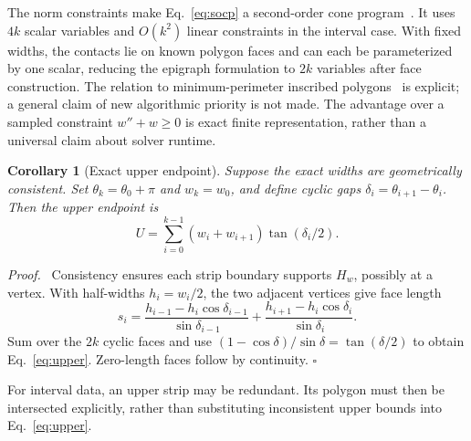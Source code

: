 \documentclass[11pt,a4paper]{article}
\newtheorem{corollary}[theorem]{Corollary}
\newenvironment{proof}{\par\noindent\textit{Proof.}\ }{\hfill$\square$\par\medskip}
\begin{document}
The norm constraints make Eq.~\eqref{eq:socp} a second-order cone program~\cite{lobo}. It uses $4k$ scalar variables and $O(k^2)$ linear constraints in the interval case. With fixed widths, the contacts lie on known polygon faces and can each be parameterized by one scalar, reducing the epigraph formulation to $2k$ variables after face construction. The relation to minimum-perimeter inscribed polygons~\cite{kodmon} is explicit; a general claim of new algorithmic priority is not made. The advantage over a sampled constraint $w''+w\ge0$ is exact finite representation, rather than a universal claim about solver runtime.

\begin{corollary}[Exact upper endpoint]
\label{cor:upper}
Suppose the exact widths are geometrically consistent. Set $\theta_k=\theta_0+\pi$ and $w_k=w_0$, and define cyclic gaps $\delta_i=\theta_{i+1}-\theta_i$. Then the upper endpoint is
\begin{equation}
U=\sum_{i=0}^{k-1}(w_i+w_{i+1})\tan(\delta_i/2).
\label{eq:upper}
\end{equation}
\end{corollary}
\begin{proof}
Consistency ensures each strip boundary supports $H_w$, possibly at a vertex. With half-widths $h_i=w_i/2$, the two adjacent vertices give face length
\[
s_i=\frac{h_{i-1}-h_i\cos\delta_{i-1}}{\sin\delta_{i-1}}
+\frac{h_{i+1}-h_i\cos\delta_i}{\sin\delta_i}.
\]
Sum over the $2k$ cyclic faces and use $(1-\cos\delta)/\sin\delta=\tan(\delta/2)$ to obtain Eq.~\eqref{eq:upper}. Zero-length faces follow by continuity.
\end{proof}
For interval data, an upper strip may be redundant. Its polygon must then be intersected explicitly, rather than substituting inconsistent upper bounds into Eq.~\eqref{eq:upper}.
\end{document}
